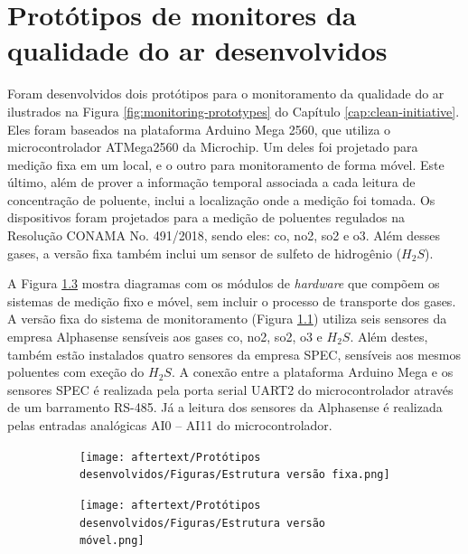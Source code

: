\chapter{Protótipos de monitores da qualidade do ar desenvolvidos}\label{apendix: hw-prototypes}

Foram desenvolvidos dois protótipos para o monitoramento da qualidade do ar ilustrados na Figura \ref{fig:monitoring-prototypes} do Capítulo \ref{cap:clean-initiative}. Eles foram baseados na plataforma Arduino Mega 2560, que utiliza o microcontrolador ATMega2560 da Microchip. Um deles foi projetado para medição fixa em um local, e o outro para monitoramento de forma móvel. Este último, além de prover a informação temporal associada a cada leitura de concentração de poluente, inclui a localização onde a medição foi tomada. Os dispositivos foram projetados para a medição de poluentes regulados na Resolução CONAMA No. 491/2018, sendo eles: \acrshort{co}, \acrshort{no2}, \acrshort{so2} e \acrshort{o3}. Além desses gases, a versão fixa também inclui um sensor de sulfeto de hidrogênio ($H_2S$). 

A Figura \ref{fig:diagrama-sistemas} mostra diagramas com os módulos de \textit{hardware} que compõem os sistemas de medição fixo e móvel, sem incluir o processo de transporte dos gases. A versão fixa do sistema de monitoramento (Figura \ref{fig:estrutura-fixo}) utiliza seis sensores da empresa Alphasense sensíveis aos gases \acrshort{co}, \acrshort{no2}, \acrshort{so2}, \acrshort{o3} e $H_2S$. Além destes, também estão instalados quatro sensores da empresa SPEC, sensíveis aos mesmos poluentes com exeção do $H_2S$. A conexão entre a plataforma Arduino Mega e os sensores SPEC é realizada pela porta serial UART2 do microcontrolador através de um barramento RS-485. Já a leitura dos sensores da Alphasense é realizada pelas entradas analógicas AI0 – AI11 do microcontrolador.

\begin{figure}[h]
    \centering
    \caption{Diagrama de blocos dos sistemas fixo (a) e móvel (b)}
    \begin{subfigure}{0.495\textwidth}
        \centering
        \texttt{[image: aftertext/Protótipos desenvolvidos/Figuras/Estrutura versão fixa.png]}
        \caption{}
        \label{fig:estrutura-fixo}
    \end{subfigure}
    \hfill
    \begin{subfigure}{0.495\textwidth}
        \centering
        \texttt{[image: aftertext/Protótipos desenvolvidos/Figuras/Estrutura versão móvel.png]}
        \caption{}
        \label{fig:estrutura-mov}
    \end{subfigure}
    \label{fig:diagrama-sistemas}
\end{figure}

